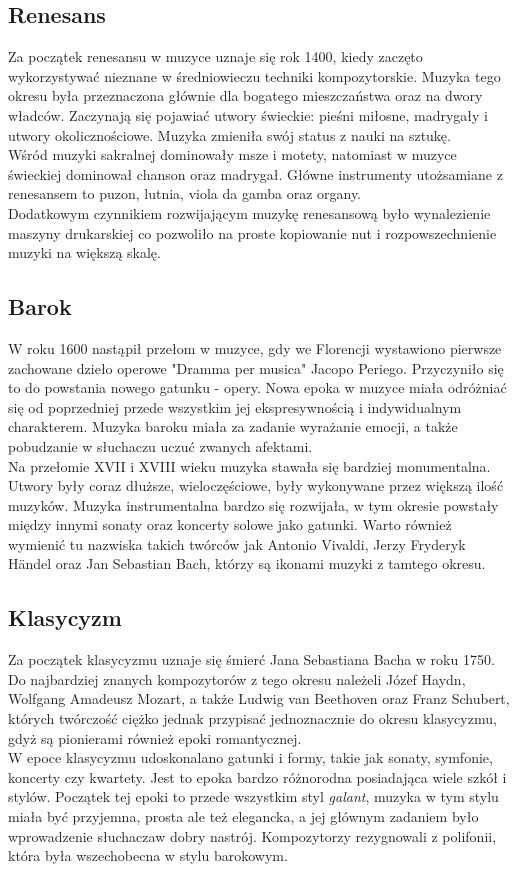 \documentclass[printmode, eng, openany]{mgr}
\newcommand\tab[1][1cm]{\hspace*{#1}}
\begin{document}
\subsection{Renesans}
\tab Za początek renesansu w muzyce uznaje się rok 1400, kiedy zaczęto wykorzystywać nieznane w średniowieczu techniki kompozytorskie. Muzyka tego okresu była przeznaczona głównie dla bogatego mieszczaństwa oraz na dwory władców. Zaczynają się pojawiać utwory świeckie: pieśni miłosne, madrygały i utwory okolicznościowe. Muzyka zmieniła swój status z nauki na sztukę. \\
\tab Wśród muzyki sakralnej dominowały msze i motety, natomiast w muzyce świeckiej dominował chanson oraz madrygał. Główne instrumenty utożsamiane z renesansem to puzon, lutnia, viola da gamba oraz organy. \\
\tab Dodatkowym czynnikiem rozwijającym muzykę renesansową było wynalezienie maszyny drukarskiej co pozwoliło na proste kopiowanie nut i rozpowszechnienie muzyki na większą skalę. \cite{ren}
\subsection{Barok}
\tab W roku 1600 nastąpił przełom w muzyce, gdy we Florencji wystawiono pierwsze zachowane dzieło operowe "Dramma per musica" Jacopo Periego. Przyczyniło się to do powstania nowego gatunku - opery. Nowa epoka w muzyce miała odróżniać się od  poprzedniej przede wszystkim jej ekspresywnością i indywidualnym charakterem. Muzyka baroku miała za zadanie wyrażanie emocji, a także pobudzanie w słuchaczu uczuć zwanych afektami.\\
\tab Na przełomie XVII i XVIII wieku muzyka stawała się bardziej monumentalna. Utwory były coraz dłuższe, wieloczęściowe, były wykonywane przez większą ilość muzyków. Muzyka instrumentalna bardzo się rozwijała, w tym okresie powstały między innymi sonaty oraz koncerty solowe jako gatunki. Warto również wymienić tu nazwiska takich twórców jak Antonio Vivaldi, Jerzy Fryderyk Händel oraz Jan Sebastian Bach, którzy są ikonami muzyki z tamtego okresu. \cite{bar}\\
\subsection{Klasycyzm}
\tab Za początek klasycyzmu uznaje się śmierć Jana Sebastiana Bacha w roku 1750. Do najbardziej znanych kompozytorów z tego okresu należeli Józef Haydn, Wolfgang Amadeusz Mozart, a także Ludwig van Beethoven oraz Franz Schubert, których twórczość ciężko jednak przypisać jednoznacznie do okresu klasycyzmu, gdyż są pionierami również epoki romantycznej.\\
\tab W epoce klasycyzmu udoskonalano gatunki i formy, takie jak sonaty, symfonie, koncerty czy kwartety. Jest to epoka bardzo różnorodna posiadająca wiele szkół i stylów. Początek tej epoki to przede wszystkim styl \textit{galant}, muzyka w tym stylu miała być przyjemna, prosta ale też elegancka, a jej głównym zadaniem było wprowadzenie słuchacza\linebreak w dobry nastrój. Kompozytorzy rezygnowali z polifonii, która była wszechobecna w stylu barokowym. \cite{clas} 
\end{document}
